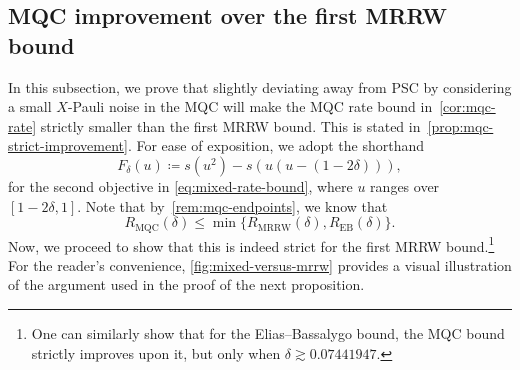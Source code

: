 \documentclass[11pt]{article}
\renewcommand{\leq}{\leqslant}
\theoremstyle{remark}
\newcommand{\MRRW}{R_{\mathrm{MRRW}}}
\newcommand{\MQC}{\mathrm{MQC}}
\begin{document}
\subsection{MQC improvement over the first MRRW bound}
\label{subsec:mqc-first-mrrw-improvement}

In this subsection, we prove that slightly deviating away from PSC by considering a small $X$-Pauli noise in the MQC will make the MQC rate bound in~\cref{cor:mqc-rate} strictly smaller than the first MRRW bound. This is stated in~\cref{prop:mqc-strict-improvement}. For ease of exposition, we adopt the shorthand
\begin{equation}
\label{eq:mqc-holevo-function}
F_\delta(u) \coloneqq s(u^2)-s\left(u(u-(1-2\delta))\right),
\end{equation}
for the second objective in \eqref{eq:mixed-rate-bound}, where $u$ ranges over $[1-2\delta,1]$. Note that by~\cref{rem:mqc-endpoints}, we know that
\begin{equation*}
R_{\MQC}(\delta) \leq \min\{\MRRW(\delta),R_{\mathrm{EB}}(\delta)\}.
\end{equation*}
Now, we proceed to show that this is indeed strict for the first MRRW bound.\footnote{One can similarly show that for the Elias--Bassalygo bound, the MQC bound strictly improves upon it, but only when $\delta \gtrsim 0.07441947$.} For the reader's convenience, \cref{fig:mixed-versus-mrrw} provides a visual illustration of the argument used in the proof of the next proposition.
\end{document}
